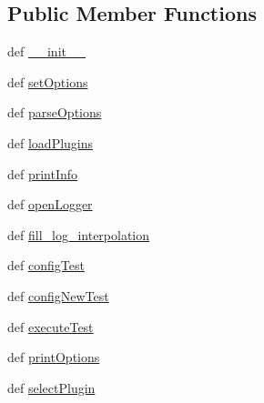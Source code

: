 \subsection*{Public Member Functions}
\begin{DoxyCompactItemize}
\item 
def \hyperlink{classTestDef_1_1TestDef_a8726684b78fbeb50a85915c6ff70050a}{\-\_\-\-\_\-init\-\_\-\-\_\-}
\item 
def \hyperlink{classTestDef_1_1TestDef_a65ffa863be5ebac4c4e6789e60377311}{set\-Options}
\item 
def \hyperlink{classTestDef_1_1TestDef_a35094bb7b74996ba7536ba5ec4df516b}{parse\-Options}
\item 
def \hyperlink{classTestDef_1_1TestDef_ae25d1dd3e674e2b0c2b1970e653ecfec}{load\-Plugins}
\item 
def \hyperlink{classTestDef_1_1TestDef_a8181c40f19ab55c7ba356d42c2fbbe5b}{print\-Info}
\item 
def \hyperlink{classTestDef_1_1TestDef_a3685bd47cb3be226c09d6737107dba04}{open\-Logger}
\item 
def \hyperlink{classTestDef_1_1TestDef_a1eef52449af7cd41049963ccbd8699c8}{fill\-\_\-log\-\_\-interpolation}
\item 
def \hyperlink{classTestDef_1_1TestDef_a2a10cd354fb5b287a8e6fa8a2d5e1915}{config\-Test}
\item 
def \hyperlink{classTestDef_1_1TestDef_a480ed48dbd7cf34cb2cbd8219999aaad}{config\-New\-Test}
\item 
def \hyperlink{classTestDef_1_1TestDef_a3eeef61386a154552981676b1893e59e}{execute\-Test}
\item 
def \hyperlink{classTestDef_1_1TestDef_a02bd5283e28743c874846f1c4c6bdf08}{print\-Options}
\item 
def \hyperlink{classTestDef_1_1TestDef_a2b517830435062cfa6c859ddce85ea81}{select\-Plugin}
\end{DoxyCompactItemize}
